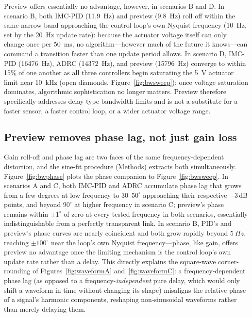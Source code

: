 \documentclass[fleqn,10pt]{wlscirep}
\begin{document}
Preview offers essentially no advantage, however, in scenarios B and D. In scenario B, both IMC-PID (\SI{11.9}{Hz}) and preview (\SI{9.8}{Hz}) roll off within the same narrow band approaching the control loop's own Nyquist frequency (\SI{10}{Hz}, set by the \SI{20}{Hz} update rate): because the actuator voltage itself can only change once per \SI{50}{ms}, no algorithm---however much of the future it knows---can command a transition faster than one update period allows. In scenario D, IMC-PID (\SI{16476}{Hz}), ADRC (\SI{14372}{Hz}), and preview (\SI{15796}{Hz}) converge to within 15\% of one another as all three controllers begin saturating the \SI{5}{V} actuator limit near \SI{10}{kHz} (open diamonds, Figure~\ref{fig:bwsweep}); once voltage saturation dominates, algorithmic sophistication no longer matters. Preview therefore specifically addresses delay-type bandwidth limits and is not a substitute for a faster sensor, a faster control loop, or a wider actuator voltage range.

\subsection*{Preview removes phase lag, not just gain loss}

Gain roll-off and phase lag are two faces of the same frequency-dependent distortion, and the sine-fit procedure (Methods) extracts both simultaneously. Figure~\ref{fig:bwphase} plots the phase companion to Figure~\ref{fig:bwsweep}. In scenarios A and C, both IMC-PID and ADRC accumulate phase lag that grows from a few degrees at low frequency to $30$--$50^\circ$ approaching their respective $-3$\,dB points, and beyond $90^\circ$ at higher frequency in scenario C; preview's phase remains within $\pm 1^\circ$ of zero at every tested frequency in both scenarios, essentially indistinguishable from a perfectly transparent link. In scenario B, PID's and preview's phase curves are nearly coincident and both grow rapidly beyond $\SI{5}{Hz}$, reaching $\pm 100^\circ$ near the loop's own Nyquist frequency---phase, like gain, offers preview no advantage once the limiting mechanism is the control loop's own update rate rather than a delay. This directly explains the square-wave corner-rounding of Figures~\ref{fig:waveformA} and~\ref{fig:waveformC}: a frequency-dependent phase lag (as opposed to a frequency-\emph{independent} pure delay, which would only shift a waveform in time without changing its shape) misaligns the relative phase of a signal's harmonic components, reshaping non-sinusoidal waveforms rather than merely delaying them.
\end{document}
